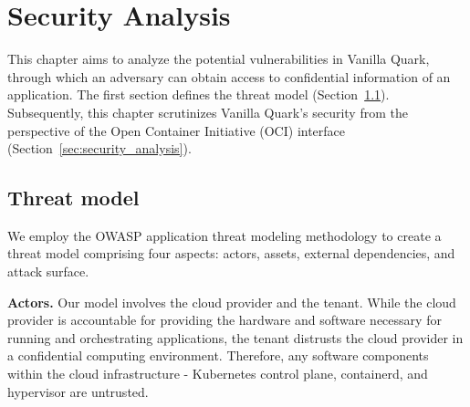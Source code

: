 \chapter{Security Analysis}
\label{sec:security_analyse}




This chapter aims to analyze the potential vulnerabilities in Vanilla Quark, through which an adversary can obtain access to confidential information of an application. The first section defines the threat model (Section~\ref{sec:Threat_model}). 
Subsequently, this chapter scrutinizes Vanilla Quark's security from the perspective of the Open Container Initiative (OCI) interface~\cite*{oci-runtime-spec} (Section~\ref{sec:security_analysis}).

\section{Threat model}
\label{sec:Threat_model}
We employ the OWASP application threat modeling methodology\cite*{OWASP_Threat_Modeling} to create a threat model comprising four aspects: actors, assets, external dependencies, and attack surface. 

\textbf{Actors.} Our model involves the cloud provider and the tenant. While the cloud provider is accountable for providing the hardware and software necessary for running and orchestrating applications, the tenant distrusts the cloud provider 
in a confidential computing environment. Therefore, any software components within the cloud infrastructure - Kubernetes control plane\cite*{k8s}, containerd\cite*{containerd}, and hypervisor are untrusted.


